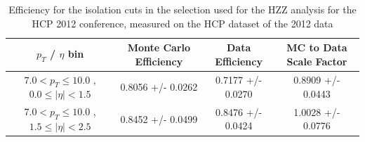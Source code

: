 \documentclass{cmspaper}
\begin{document}
 \begin{table}[!ht]
 \begin{center} 
 \begin{tabular}{|c|c|c|c|}
 \hline
 $p_{T}$ / $\eta$ bin    &  Monte Carlo Efficiency    &  Data Efficiency   &  MC to Data Scale Factor \\   \hline           
$  7.0 < p_{T} \le  10.0$ , $  0.0  \le |\eta| <   1.5$   &       0.8056 +/- 0.0262   &       0.7177 +/- 0.0270   &       0.8909 +/- 0.0443   \\   
\hline
$  7.0 < p_{T} \le  10.0$ , $  1.5  \le |\eta| <   2.5$   &       0.8452 +/- 0.0499   &       0.8476 +/- 0.0424   &       1.0028 +/- 0.0776   \\   
\hline
\end{tabular}
\caption{ Efficiency for the isolation cuts in the selection used for the HZZ analysis for the HCP 2012 conference, 
  measured on the HCP dataset of the 2012 data  }
\label{tab:Efficiency_HZZICHEP2012Iso_HCP2012}
\end{center}
\end{table}
\end{document}
